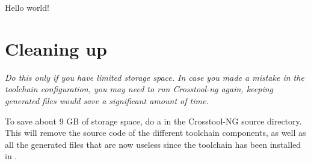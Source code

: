 \begin{terminaloutput}
Hello world!
\end{terminaloutput}

\section{Cleaning up}

{\em Do this only if you have limited storage space. In case you made a
mistake in the toolchain configuration, you may need to run Crosstool-ng
again, keeping generated files would save a significant amount of time.}

To save about 9 GB of storage space, do a  in the
Crosstool-NG source directory. This will remove the source code of the
different toolchain components, as well as all the generated files
that are now useless since the toolchain has been installed in
.
